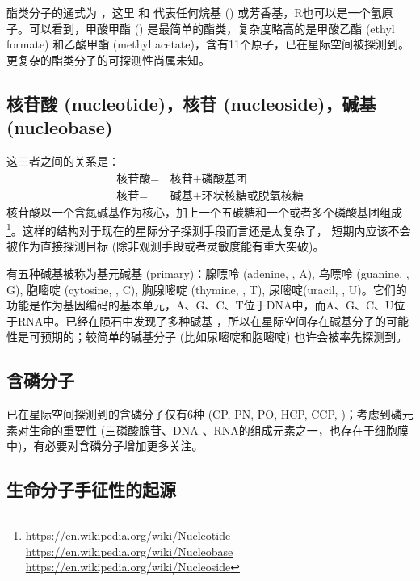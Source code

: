 \documentclass{report}
\begin{document}
酯类分子的通式为 ，这里  和  代表任何烷基 () 或芳香基，R也可以是一个氢原子。可以看到，甲酸甲酯 () 是最简单的酯类，复杂度略高的是甲酸乙酯 (ethyl formate) 和乙酸甲酯 (methyl acetate)，含有11个原子，已在星际空间被探测到。更复杂的酯类分子的可探测性尚属未知。

\subsection{核苷酸 (nucleotide)，核苷 (nucleoside)，碱基 (nucleobase)}

这三者之间的关系是：
\begin{equation}
\begin{split}
\text{核苷酸} =&\, \text{核苷} + \text{磷酸基团}\\
\text{核苷}   =&\, \text{碱基} + \text{环状核糖或脱氧核糖}
\end{split} 
\end{equation}
核苷酸以一个含氮碱基作为核心，加上一个五碳糖和一个或者多个磷酸基团组成\footnote{\url{https://en.wikipedia.org/wiki/Nucleotide} \url{https://en.wikipedia.org/wiki/Nucleobase} \url{https://en.wikipedia.org/wiki/Nucleoside}}。这样的结构对于现在的星际分子探测手段而言还是太复杂了，
短期内应该不会被作为直接探测目标 (除非观测手段或者灵敏度能有重大突破)。

有五种碱基被称为基元碱基 (primary)：腺嘌呤 (adenine, , A), 鸟嘌呤 (guanine, , G), 胞嘧啶 (cytosine, , C), 胸腺嘧啶 (thymine, , T), 尿嘧啶(uracil, , U)。它们的功能是作为基因编码的基本单元，A、G、C、T位于DNA中，而A、G、C、U位于RNA中。已经在陨石中发现了多种碱基 \citep{Callahan2011}，所以在星际空间存在碱基分子的可能性是可预期的；较简单的碱基分子 (比如尿嘧啶和胞嘧啶) 也许会被率先探测到。

\subsection{含磷分子}

已在星际空间探测到的含磷分子仅有6种 (CP, PN, PO, HCP, CCP, )；考虑到磷元素对生命的重要性 (三磷酸腺苷、DNA
、RNA的组成元素之一，也存在于细胞膜中)，有必要对含磷分子增加更多关注。



\subsection{生命分子手征性的起源}
\end{document}
